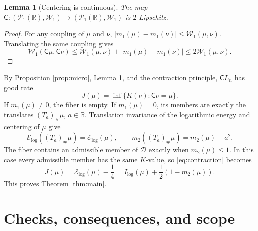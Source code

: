\documentclass[11pt]{article}
\newtheorem{lemma}{Lemma}
\newcommand{\R}{\mathbb R}
\newcommand{\Pone}{\mathcal P_1(\R)}
\newcommand{\W}{\mathcal W}
\newcommand{\E}{\mathcal E_{\log}}
\begin{document}
\begin{lemma}[Centering is continuous]\label{lem:center}
The map $\mathsf C:(\Pone,\W_1)\to(\Pone,\W_1)$ is $2$-Lipschitz.
\end{lemma}
\begin{proof}
For any coupling of $\mu$ and $\nu$,
$|m_1(\mu)-m_1(\nu)|\le\W_1(\mu,\nu)$. Translating the same coupling gives
\[
 \W_1(\mathsf C\mu,\mathsf C\nu)
 \le\W_1(\mu,\nu)+|m_1(\mu)-m_1(\nu)|
 \le2\W_1(\mu,\nu).
\]
\end{proof}

By Proposition \ref{prop:micro}, Lemma \ref{lem:center}, and the contraction
principle, $\mathsf C L_n$ has good rate
\begin{equation}\label{eq:contraction}
 J(\mu)=\inf\{K(\nu):\mathsf C\nu=\mu\}.
\end{equation}
If $m_1(\mu)\ne0$, the fiber is empty. If $m_1(\mu)=0$, its members are
exactly the translates $(T_a)_{\#}\mu$, $a\in\R$. Translation invariance of
the logarithmic energy and centering of $\mu$ give
\begin{equation}\label{eq:fiber}
 \E((T_a)_{\#}\mu)=\E(\mu),\qquad
 m_2((T_a)_{\#}\mu)=m_2(\mu)+a^2.
\end{equation}
The fiber contains an admissible member of $\mathcal D$ exactly when
$m_2(\mu)\le1$. In this case every admissible member has the same $K$-value,
so \eqref{eq:contraction} becomes
\[
 J(\mu)=\E(\mu)-\frac14
 =I_{\log}(\mu)+\frac12(1-m_2(\mu)).
\]
This proves Theorem \ref{thm:main}.

\section{Checks, consequences, and scope}
\end{document}
